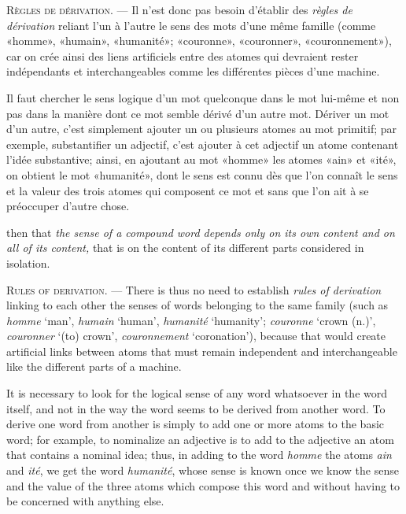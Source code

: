 \begin{sloppypar}
{  \textsc{Règles de dérivation}. — Il n’est donc pas besoin d’établir
  des \emph{règles de dérivation} reliant l’un à l’autre le sens des
  mots d’une même famille (comme «homme», «humain», «humanité»;
  «couronne», «couronner», «couronnement»), car on crée ainsi des
  liens artificiels entre des atomes qui devraient rester indépendants
  et interchangeables comme les différentes pièces d’une machine.

  Il faut chercher le sens logique d’un mot quelconque dans le mot
  lui-même et non pas dans la manière dont ce mot semble dérivé d’un
  autre mot. Dériver un mot d’un autre, c’est simplement ajouter un ou
  plusieurs atomes au mot primitif; par exemple, substantifier un
  adjectif, c’est ajouter à cet adjectif un atome contenant l’idée
  substantive; ainsi, en ajoutant au mot «homme» les atomes «ain» et
  «ité», on obtient le mot «humanité», dont le sens est connu dès que
  l’on connaît le sens et la valeur des trois atomes qui composent ce
  mot et sans que l’on ait à se préoccuper d’autre chose.  }
{\protect\noindent then that \emph{the sense of a compound word
    depends only on its own content and on all of its content,} that
  is on the content of its different parts considered in isolation.

  \textsc{Rules of derivation.} --- There is thus no need to establish
  \emph{rules of derivation} linking to each other the senses of words
  belonging to the same family (such as \emph{homme} `man',
  \emph{humain} `human', \emph{humanité} `humanity'; \emph{couronne}
  `crown (n.)', \emph{couronner} `(to) crown', \emph{couronnement}
  `coronation'), because that would create artificial links between
  atoms that must remain independent and interchangeable like the
  different parts of a machine.

  It is necessary to look for the logical sense of any word whatsoever
  in the word itself, and not in the way the word seems to be derived
  from another word. To derive one word from another is simply to add
  one or more atoms to the basic word; for example, to nominalize an
  adjective is to add to the adjective an atom that contains a nominal
  idea; thus, in adding to the word \emph{homme} the atoms \emph{ain}
  and \emph{ité}, we get the word \emph{humanité}, whose sense is
  known once we know the sense and the value of the three atoms which
  compose this word and without having to be concerned with anything
  else. }

\end{sloppypar}
